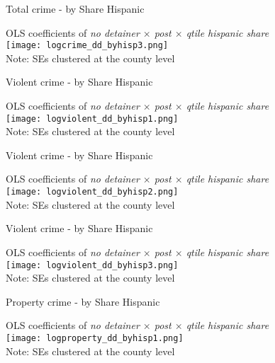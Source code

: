 \documentclass[xcolor=pdftex,dvipsnames,table]{beamer}
\begin{document}
\begin{frame}{Total crime - by Share Hispanic}
\footnotesize
\begin{center}
OLS coefficients of \textit{no detainer $\times$ post $\times$ qtile hispanic share}\\
\texttt{[image: logcrime\_dd\_byhisp3.png]}\\
\footnotesize{Note: SEs clustered at the county level}
\end{center}
\end{frame}

\begin{frame}{Violent crime - by Share Hispanic}
\footnotesize
\begin{center}
OLS coefficients of \textit{no detainer $\times$ post $\times$ qtile hispanic share}\\
\texttt{[image: logviolent\_dd\_byhisp1.png]}\\
\footnotesize{Note: SEs clustered at the county level}
\end{center}
\end{frame}

\begin{frame}{Violent crime - by Share Hispanic}
\footnotesize
\begin{center}
OLS coefficients of \textit{no detainer $\times$ post $\times$ qtile hispanic share}\\
\texttt{[image: logviolent\_dd\_byhisp2.png]}\\
\footnotesize{Note: SEs clustered at the county level}
\end{center}
\end{frame}

\begin{frame}{Violent crime - by Share Hispanic}
\footnotesize
\begin{center}
OLS coefficients of \textit{no detainer $\times$ post $\times$ qtile hispanic share}\\
\texttt{[image: logviolent\_dd\_byhisp3.png]}\\
\footnotesize{Note: SEs clustered at the county level}
\end{center}
\end{frame}

\begin{frame}{Property crime - by Share Hispanic}
\footnotesize
\begin{center}
OLS coefficients of \textit{no detainer $\times$ post $\times$ qtile hispanic share}\\
\texttt{[image: logproperty\_dd\_byhisp1.png]}\\
\footnotesize{Note: SEs clustered at the county level}
\end{center}
\end{frame}
\end{document}
